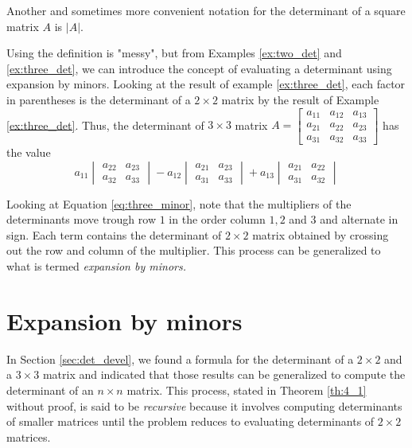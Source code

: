 \documentclass[../main.tex]{subfiles}
\begin{document}
\begin{remark} \label{rm:other_det} 

Another and sometimes more convenient notation for the determinant of a square matrix \(A\) is \(|A|\).
\end{remark}

Using the definition is "messy", but from Examples \ref{ex:two_det} and \ref{ex:three_det}, we can introduce the concept of evaluating a determinant using expansion by minors. Looking at the result of example \ref{ex:three_det}, each factor in parentheses is the determinant of a \(2 \times 2\) matrix by the result of Example \ref{ex:three_det}. Thus, the determinant of \(3 \times 3\) matrix 
\(A = 
  \begin{bmatrix}
  a_{11} & a_{12} & a_{13} \\
  a_{21} & a_{22} & a_{23} \\
  a_{31} & a_{32} & a_{33} 
  \end{bmatrix}
\)
 has the value
 \begin{equation} \label{eq:three_minor}
   a_{11}
   \begin{vmatrix}
     a_{22} & a_{23} \\
     a_{32} & a_{33}
   \end{vmatrix}
   -a_{12}
   \begin{vmatrix}
     a_{21} & a_{23} \\
     a_{31} & a_{33} 
   \end{vmatrix}
   +a_{13}
   \begin{vmatrix}
     a_{21} & a_{22} \\
     a_{31} & a_{32} 
   \end{vmatrix}
 \end{equation}
  
\noindent Looking at Equation \ref{eq:three_minor}, note that the multipliers of the determinants move trough row \(1\) in the order column \(1, 2\) and \(3\) and alternate in sign. Each term contains the determinant of \(2 \times 2\) matrix obtained by crossing out the row and column of the multiplier. This process can be generalized to what is termed \textit{expansion by minors.}

\section{Expansion by minors} \label{sec:minor_exp}
\noindent In Section \ref{sec:det_devel}, we found a formula for the determinant of a \(2 \times 2\) and a \(3 \times 3\) matrix and indicated that those results can be generalized to compute the determinant of an \(n \times n\) matrix. This process, stated in Theorem \ref{th:4_1} without proof, is said to be \textit{recursive} because it involves computing determinants of smaller matrices until the problem reduces to evaluating determinants of \(2 \times 2\) matrices.
\end{document}
